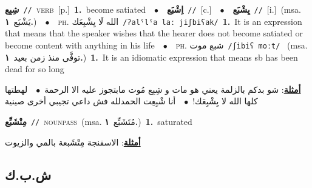 \documentclass[10pt,a4paper,twoside]{article} %
\begin{document}
\begin{multicols}{2}
{\setlength\topsep{0pt}\textbf{\foreignlanguage{arabic}{شِبِع}}\ {\color{gray}\texttt{//}\color{black}}\ \textsc{verb}\ [p.]\ \textbf{1.}~become satiated\ \ $\bullet$\ \ \setlength\topsep{0pt}\textbf{\foreignlanguage{arabic}{اِشْبَع}}\ {\color{gray}\texttt{//}\color{black}}\ [c.]\ \ $\bullet$\ \ \setlength\topsep{0pt}\textbf{\foreignlanguage{arabic}{يِشْبَع}}\ {\color{gray}\texttt{//}\color{black}}\ [i.]\ \color{gray}(msa. \foreignlanguage{arabic}{يَشْبَع}~\foreignlanguage{arabic}{\textbf{١.}})\color{black}\ \ $\bullet$\ \ \textsc{ph.} \color{gray} \foreignlanguage{arabic}{الله لَا يِشْبِعَك}\color{black}\ {\color{gray}\texttt{/{\sffamily ʔalˤlˤa laː jiʃbiʕak}/}\color{black}}\ \textbf{1.}~It is an expression that means that the speaker wishes that the hearer does not become satiated or become content with anything in his life\ \ $\bullet$\ \ \textsc{ph.} \color{gray} \foreignlanguage{arabic}{شبع موت}\color{black}\ {\color{gray}\texttt{/{\sffamily ʃibiʕ moːt}/}\color{black}}\ \color{gray} (msa. \foreignlanguage{arabic}{توفَّى منذ زمن بعيد}~\foreignlanguage{arabic}{\textbf{١.}})\color{black}\ \textbf{1.}~It is an idiomatic expression that means sb has been dead for so long\  \begin{flushright}\color{gray}\foreignlanguage{arabic}{\textbf{\underline{\foreignlanguage{arabic}{أمثلة}}}: شو بدكم بالزلمة يعني هو مات و شِبِع مُوت مابتجوز عليه الا الرحمة\ $\bullet$\ \  لهطتها كلها الله لا يِشْبِعَك!\ $\bullet$\ \  أنا شْبِعِت الحمدلله فش داعي تجيبي أخرى صينية}\end{flushright}\color{black}} \vspace{2mm}

{\setlength\topsep{0pt}\textbf{\foreignlanguage{arabic}{مِتْشَبِّع}}\ {\color{gray}\texttt{//}\color{black}}\ \textsc{noun\textunderscore pass}\ \color{gray}(msa. \foreignlanguage{arabic}{مُتَشَبِّع}~\foreignlanguage{arabic}{\textbf{١.}})\color{black}\ \textbf{1.}~saturated\  \begin{flushright}\color{gray}\foreignlanguage{arabic}{\textbf{\underline{\foreignlanguage{arabic}{أمثلة}}}: الاسفنجة مِتْشَبعة بالمي والزيوت}\end{flushright}\color{black}} \vspace{2mm}

\vspace{-3mm}
\subsection*{\color{blue}\foreignlanguage{arabic}{ش.ب.ك}\color{blue}{}} 


\end{multicols}
\end{document}
